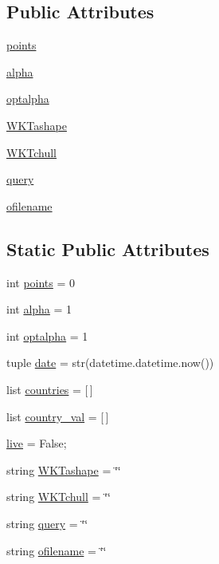 \subsection*{\-Public \-Attributes}
\begin{DoxyCompactItemize}
\item 
\hyperlink{classcReport_1_1cReport_a9d614c3227e56121d3c57704bae7db26}{points}
\item 
\hyperlink{classcReport_1_1cReport_a246ac3f794450b5b61f4edbb1ecafb1d}{alpha}
\item 
\hyperlink{classcReport_1_1cReport_a28c5449654f0d82786f50899064a17ea}{optalpha}
\item 
\hyperlink{classcReport_1_1cReport_a0f4e44398eb278795a1ce672af771269}{\-W\-K\-Tashape}
\item 
\hyperlink{classcReport_1_1cReport_a33f6f905809ab52ed7c14579e75d6a71}{\-W\-K\-Tchull}
\item 
\hyperlink{classcReport_1_1cReport_a3e1013fb70a77597e8cfb755915eec5b}{query}
\item 
\hyperlink{classcReport_1_1cReport_a1e2841279bf68746dd5f937644784bbe}{ofilename}
\end{DoxyCompactItemize}
\subsection*{\-Static \-Public \-Attributes}
\begin{DoxyCompactItemize}
\item 
int \hyperlink{classcReport_1_1cReport_a4596ac9da2d65fd13b3edc082cc9cb63}{points} = 0
\item 
int \hyperlink{classcReport_1_1cReport_a595025ee07907f92f21444dec822642c}{alpha} = 1
\item 
int \hyperlink{classcReport_1_1cReport_aff8a2bba24775f89b659dcf40a5a1844}{optalpha} = 1
\item 
tuple \hyperlink{classcReport_1_1cReport_a005059f270c506b0ad6b0e93d5119feb}{date} = str(datetime.\-datetime.\-now())
\item 
list \hyperlink{classcReport_1_1cReport_a544ceb0af74c7f1560cba7ce98db8a2e}{countries} = \mbox{[}$\,$\mbox{]}
\item 
list \hyperlink{classcReport_1_1cReport_a206f4433142e4df03d693ac39caf52e0}{country\-\_\-val} = \mbox{[}$\,$\mbox{]}
\item 
\hyperlink{classcReport_1_1cReport_a9af4b63ffe811101dac7f84547b2adf3}{live} = \-False;
\item 
string \hyperlink{classcReport_1_1cReport_a1f5cdf3c278d36a18eb95956aa7d685d}{\-W\-K\-Tashape} = \char`\"{}\char`\"{}
\item 
string \hyperlink{classcReport_1_1cReport_ac809de3ae4b774846e866d56f6f68468}{\-W\-K\-Tchull} = \char`\"{}\char`\"{}
\item 
string \hyperlink{classcReport_1_1cReport_a6d47bb9195cbb042f4b1ddb6fc0aca08}{query} = \char`\"{}\char`\"{}
\item 
string \hyperlink{classcReport_1_1cReport_a61c63b57462292def5d9ce457b9a7b41}{ofilename} = \char`\"{}\char`\"{}
\end{DoxyCompactItemize}


